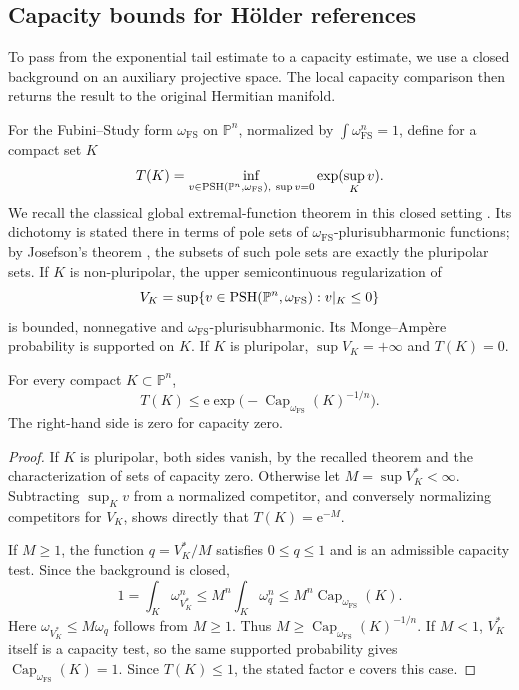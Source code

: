 \subsection{Capacity bounds for H\"older references}

To pass from the exponential tail estimate to a capacity estimate, we use a closed background on an auxiliary projective space. The local capacity comparison then returns the result to the original Hermitian manifold.

For the Fubini--Study form $\omega_{\mathrm{FS}}$ on $\mathbb P^n$, normalized by $\int\omega_{\mathrm{FS}}^n=1$, define for a compact set $K$
\[
 T(K)=\inf_{v\in\mathrm{PSH}(\mathbb P^n,\omega_{\mathrm{FS}}),\ \sup v=0}
                 \exp(\sup_Kv).
\]
We recall the classical global extremal-function theorem in this closed setting \cite[Theorem~9.17]{GZ17}. Its dichotomy is stated there in terms of pole sets of $\omega_{\mathrm{FS}}$-plurisubharmonic functions; by Josefson's theorem \cite[Theorem~12.5]{GZ17}, the subsets of such pole sets are exactly the pluripolar sets. If $K$ is non-pluripolar, the upper semicontinuous regularization of
\[
 V_K=\sup\{v\in\mathrm{PSH}(\mathbb P^n,\omega_{\mathrm{FS}}):v|_K\leq0\}
\]
is bounded, nonnegative and $\omega_{\mathrm{FS}}$-plurisubharmonic. Its Monge--Amp\`ere probability is supported on $K$. If $K$ is pluripolar, $\sup V_K=+\infty$ and $T(K)=0$.

\begin{lemma}\label{lem:projective-capacity-comparison}
For every compact $K\subset\mathbb P^n$,
\[
 T(K)\leq\mathrm e\exp\bigl(-\operatorname{Cap}_{\omega_{\mathrm{FS}}}(K)^{-1/n}\bigr).
\]
The right-hand side is zero for capacity zero.
\end{lemma}
\begin{proof}
If $K$ is pluripolar, both sides vanish, by the recalled theorem and the characterization of sets of capacity zero. Otherwise let $M=\sup V_K^*<\infty$. Subtracting $\sup_Kv$ from a normalized competitor, and conversely normalizing competitors for $V_K$, shows directly that $T(K)=\mathrm e^{-M}$.

If $M\geq1$, the function $q=V_K^*/M$ satisfies $0\leq q\leq1$ and is an admissible capacity test. Since the background is closed,
\[
 1=\int_K\omega_{V_K^*}^n
 \leq M^n\int_K\omega_q^n
 \leq M^n\operatorname{Cap}_{\omega_{\mathrm{FS}}}(K).
\]
Here $\omega_{V_K^*}\leq M\omega_q$ follows from $M\geq1$. Thus $M\geq\operatorname{Cap}_{\omega_{\mathrm{FS}}}(K)^{-1/n}$. If $M<1$, $V_K^*$ itself is a capacity test, so the same supported probability gives $\operatorname{Cap}_{\omega_{\mathrm{FS}}}(K)=1$. Since $T(K)\leq1$, the stated factor $\mathrm e$ covers this case.
\end{proof}

